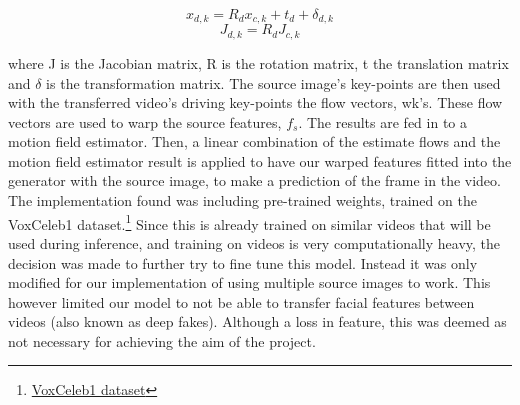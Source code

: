 \documentclass[10pt,twocolumn,letterpaper]{article}
\begin{document}
\begin{equation}
    x_{d,k} = R_d x_{c,k} + t_d + \delta_{d,k}
\end{equation}
\begin{equation}
    J_{d,k} = R_d J_{c,k}
\end{equation}

where J is the Jacobian matrix, R is the rotation matrix, t the translation matrix and $\delta$ is the transformation matrix. The source image's key-points are then used with the transferred video's driving key-points the flow vectors, wk’s. These flow vectors are used to warp the source features, $f_s$. The results are fed in to a motion field estimator. Then, a linear combination of the estimate flows and the motion field estimator result is applied to have our warped features fitted into the generator with the source image, to make a prediction of the frame in the video. \\

The implementation found was including pre-trained weights, trained on the VoxCeleb1 dataset.\footnote{\href{https://www.robots.ox.ac.uk/~vgg/data/voxceleb/vox1.html}{VoxCeleb1 dataset}} Since this is already trained on similar videos that will be used during inference, and training on videos is very computationally heavy, the decision was made to further try to fine tune this model. Instead it was only modified for our implementation of using multiple source images to work. This however limited our model to not be able to transfer facial features between videos (also known as deep fakes). Although a loss in feature, this was deemed as not necessary for achieving the aim of the project.
\end{document}
